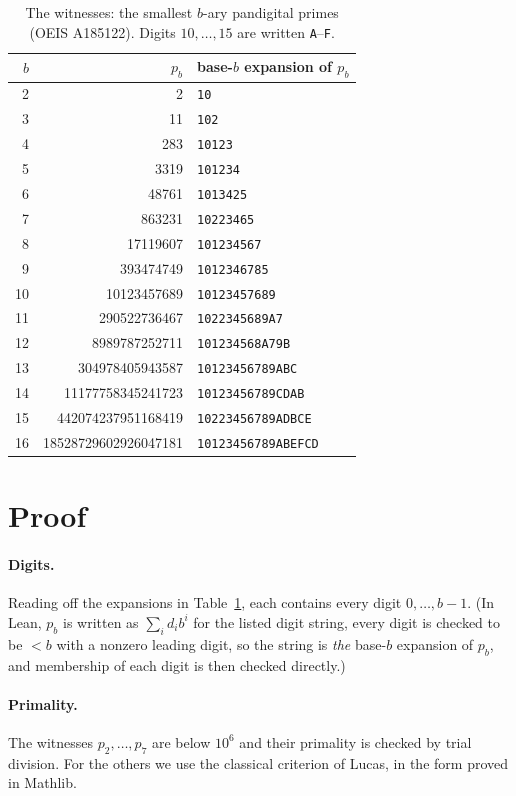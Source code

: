 \documentclass[11pt]{article}
\theoremstyle{plain}
\theoremstyle{definition}
\theoremstyle{remark}
\begin{document}
\begin{table}[ht]
\centering
\begin{tabular}{rrl}
\toprule
$b$ & $p_b$ & base-$b$ expansion of $p_b$\\
\midrule
2 & 2 & \texttt{10}\\
3 & 11 & \texttt{102}\\
4 & 283 & \texttt{10123}\\
5 & 3319 & \texttt{101234}\\
6 & 48761 & \texttt{1013425}\\
7 & 863231 & \texttt{10223465}\\
8 & 17119607 & \texttt{101234567}\\
9 & 393474749 & \texttt{1012346785}\\
10 & 10123457689 & \texttt{10123457689}\\
11 & 290522736467 & \texttt{1022345689A7}\\
12 & 8989787252711 & \texttt{101234568A79B}\\
13 & 304978405943587 & \texttt{10123456789ABC}\\
14 & 11177758345241723 & \texttt{10123456789CDAB}\\
15 & 442074237951168419 & \texttt{10223456789ADBCE}\\
16 & 18528729602926047181 & \texttt{10123456789ABEFCD}\\
\bottomrule
\end{tabular}
\caption{The witnesses: the smallest $b$-ary pandigital primes (OEIS
A185122). Digits $10,\ldots,15$ are written \texttt{A}--\texttt{F}.}
\label{tab:wit}
\end{table}

\section{Proof}

\paragraph{Digits.} Reading off the expansions in Table~\ref{tab:wit}, each
contains every digit $0,\ldots,b-1$. (In Lean, $p_b$ is written as
$\sum_i d_i b^i$ for the listed digit string, every digit is checked to be
$<b$ with a nonzero leading digit, so the string is \emph{the} base-$b$
expansion of $p_b$, and membership of each digit is then checked directly.)

\paragraph{Primality.} The witnesses $p_2,\ldots,p_7$ are below $10^6$ and
their primality is checked by trial division. For the others we use the
classical criterion of Lucas, in the form proved in Mathlib.
\end{document}
